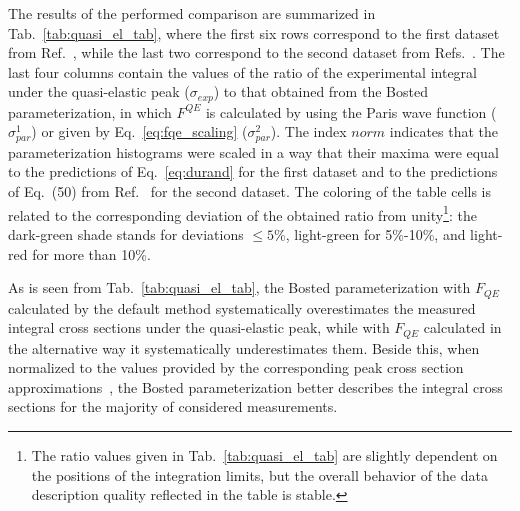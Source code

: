 The results of the performed comparison are summarized in Tab.~\ref{tab:quasi_el_tab}, where the first six rows correspond to the first dataset from Ref.~\cite{Hanson:1973vf}, while the last two correspond to the second dataset from  Refs.~\cite{Rock:1991jy,Rock_SLAC}. The last four columns contain the values of the ratio of the experimental integral under the quasi-elastic peak ($\sigma_{exp}$) to that obtained from the Bosted parameterization, in which $F^{QE}$ is calculated by using the Paris wave function ($\sigma_{par}^{1}$) or given by Eq.~\eqref{eq:fqe_scaling} ($\sigma_{par}^{2}$). The index $norm$ indicates that the parameterization histograms were scaled in a way that their maxima were equal to the predictions of Eq.~\eqref{eq:durand} for the first dataset and to the predictions of Eq.~(50) from Ref.~\cite{Kocevar:1967} for the second dataset. The coloring of the table cells is related to the corresponding deviation of the obtained ratio from unity\footnote[6]{The ratio values given in Tab.~\ref{tab:quasi_el_tab} are slightly dependent on the positions of the integration limits, but the overall behavior of the data description quality reflected in the table is stable.}: the dark-green shade stands for deviations $\leq 5$\%, light-green for 5\%-10\%, and light-red for more than 10\%. 

As is seen from Tab.~\ref{tab:quasi_el_tab}, the Bosted parameterization with $F_{QE}$ calculated by the default method systematically overestimates the measured integral cross sections under the quasi-elastic peak, while with $F_{QE}$ calculated in the alternative way it systematically underestimates them. Beside this, when normalized to the values provided by the corresponding peak cross section approximations~\cite{Durand:1961zz,Kocevar:1967}, the Bosted parameterization better describes the integral cross sections for the majority of considered measurements.



